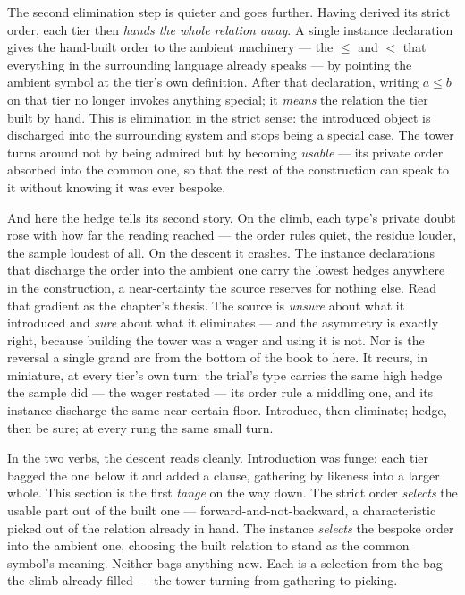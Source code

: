The second elimination step is quieter and goes further. Having derived its strict order, each tier then \emph{hands
the whole relation away}. A single instance declaration gives the hand-built order to the ambient machinery --- the
\(\leq\) and \(<\) that everything in the surrounding language already speaks --- by pointing the ambient symbol at the
tier's own definition. After that declaration, writing \(a \leq b\) on that tier no longer invokes anything special;
it \emph{means} the relation the tier built by hand. This is elimination in the strict sense: the introduced object is
discharged into the surrounding system and stops being a special case. The tower turns around not by being admired but
by becoming \emph{usable} --- its private order absorbed into the common one, so that the rest of the construction can
speak to it without knowing it was ever bespoke.

And here the hedge tells its second story. On the climb, each type's private doubt rose with how far the reading
reached --- the order rules quiet, the residue louder, the sample loudest of all. On the descent it crashes. The
instance declarations that discharge the order into the ambient one carry the lowest hedges anywhere in the
construction, a near-certainty the source reserves for nothing else. Read that gradient as the chapter's thesis. The
source is \emph{unsure} about what it introduced and \emph{sure} about what it eliminates --- and the asymmetry is
exactly right, because building the tower was a wager and using it is not. Nor is the reversal a single grand arc from
the bottom of the book to here. It recurs, in miniature, at every tier's own turn: the trial's type carries the same
high hedge the sample did --- the wager restated --- its order rule a middling one, and its instance discharge the
same near-certain floor. Introduce, then eliminate; hedge, then be sure; at every rung the same small turn.

In the two verbs, the descent reads cleanly. Introduction was funge: each tier bagged the one below it and added a
clause, gathering by likeness into a larger whole. This section is the first \emph{tange} on the way down. The strict
order \emph{selects} the usable part out of the built one --- forward-and-not-backward, a characteristic picked out of
the relation already in hand. The instance \emph{selects} the bespoke order into the ambient one, choosing the built
relation to stand as the common symbol's meaning. Neither bags anything new. Each is a selection from the bag the
climb already filled --- the tower turning from gathering to picking.

